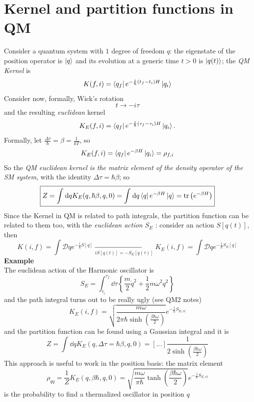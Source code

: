 \section{Kernel and partition functions in QM}
Consider a quantum system with $1$ degree of freedom $q$: the eigenstate of
the position operator is $\ket{q}$ and its evolution at a generic time $t>0$
is $\ket{q(t)}$; the \textit{QM Kernel} is
\[
    K(f,i) = \bra{q_f}e^{-\frac{i}{\hbar }(t_f-t_i)H}\ket{q_i}
\]
Consider now, formally, Wick's rotation
\[
    t\to -i\tau
\]
and the resulting \textit{euclidean} kernel
\[
    K_E(f,i) = \bra{q_f}e^{-\frac{1}{\hbar }(\tau_f-\tau_i)H}\ket{q_i}.
\]
Formally, let $\frac{\Delta \tau }{\hbar }=\beta =\frac{1}{kT}$, so
\[
    K_E(f,i) = \bra{q_f}e^{-\beta H}\ket{q_i} = \rho_{f,i}
\]
So the \textit{QM euclidean kernel is the matrix element of the density operator
of the SM system}, with the identity $\Delta \tau =\hbar \beta $; so
\[
    \boxed{Z = \int_{}^{} \dd q K_E(q,\hbar \beta ,q,0) = \int_{}^{} \dd q \bra{q}
    e^{-\beta H}\ket{q} = \tr\left(e^{-\beta H}\right)}
\]
Since the Kernel in QM is related to path integrals, the partition function can be
related to them too, with the \textit{euclidean action} $S_E$ : consider an action
$S[q(t)]$, then
\[
    K(i,f) = \int \mathcal{D}q e^{-\frac{i}{\hbar }S[q]} \underset{iS[q(t)]=
    -S_E[q(\tau)]}\longrightarrow K_E(i,f) = \int \mathcal{D}q
    e^{-\frac{1}{\hbar }S_E[q]}
\]
\textbf{Example}\\
The euclidean action of the Harmonic oscillator is
\[
    S_E=\int_{\tau_i}^{\tau_f} \dd \tau \left\{\frac{m}{2}\dot q^2 + \frac{1}{2}
    m\omega^2q^2\right\}
\]
and the path integral turns out to be really ugly (see QM2 notes)
\[
    K_E(i,f) = \sqrt{\frac{m\omega}{2\pi\hbar\sinh\left(\frac{\beta 
    \hbar \omega }{2}\right)}}e^{-\frac{1}{\hbar}S_{E,cl}}
\]
and the partition
function can be found using a Gaussian integral and it is
\[
    Z = \int_{}^{} \dd q K_E(q,\Delta \tau =\hbar \beta,q,0) =[...]
    \frac{1}{2\sinh\left(\frac{\beta \hbar \omega }{2}\right)}
\]
This approach is useful to work in the position basis: the matrix element
\[
    \rho_{qq} = \frac{1}{Z}K_E(q,\beta \hbar ,q,0) =
    \sqrt{\frac{m\omega}{\pi\hbar}\tanh\left(\frac{\beta \hbar \omega }{2}\right)}
    e^{-\frac{1}{\hbar }S_{E,cl}}
\]      
is the probability to find a thermalized oscillator in position $q$
